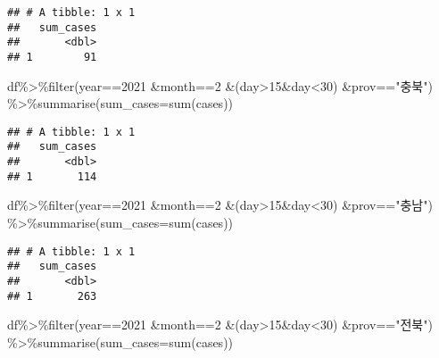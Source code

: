 \documentclass[
]{article}
\newenvironment{Shaded}{\begin{snugshade}}{\end{snugshade}}
\newcommand{\AttributeTok}[1]{\textcolor[rgb]{0.77,0.63,0.00}{#1}}
\newcommand{\DecValTok}[1]{\textcolor[rgb]{0.00,0.00,0.81}{#1}}
\newcommand{\FunctionTok}[1]{\textcolor[rgb]{0.00,0.00,0.00}{#1}}
\newcommand{\NormalTok}[1]{#1}
\newcommand{\SpecialCharTok}[1]{\textcolor[rgb]{0.00,0.00,0.00}{#1}}
\newcommand{\StringTok}[1]{\textcolor[rgb]{0.31,0.60,0.02}{#1}}
\begin{document}
\begin{verbatim}
## # A tibble: 1 x 1
##   sum_cases
##       <dbl>
## 1        91
\end{verbatim}

\begin{Shaded}
\begin{Highlighting}[]
\NormalTok{df}\SpecialCharTok{\%\textgreater{}\%}\FunctionTok{filter}\NormalTok{(year}\SpecialCharTok{==}\DecValTok{2021} \SpecialCharTok{\&}\NormalTok{month}\SpecialCharTok{==}\DecValTok{2} \SpecialCharTok{\&}\NormalTok{(day}\SpecialCharTok{\textgreater{}}\DecValTok{15}\SpecialCharTok{\&}\NormalTok{day}\SpecialCharTok{\textless{}}\DecValTok{30}\NormalTok{) }\SpecialCharTok{\&}\NormalTok{prov}\SpecialCharTok{==}\StringTok{"충북"}\NormalTok{) }\SpecialCharTok{\%\textgreater{}\%}\FunctionTok{summarise}\NormalTok{(}\AttributeTok{sum\_cases=}\FunctionTok{sum}\NormalTok{(cases))}
\end{Highlighting}
\end{Shaded}

\begin{verbatim}
## # A tibble: 1 x 1
##   sum_cases
##       <dbl>
## 1       114
\end{verbatim}

\begin{Shaded}
\begin{Highlighting}[]
\NormalTok{df}\SpecialCharTok{\%\textgreater{}\%}\FunctionTok{filter}\NormalTok{(year}\SpecialCharTok{==}\DecValTok{2021} \SpecialCharTok{\&}\NormalTok{month}\SpecialCharTok{==}\DecValTok{2} \SpecialCharTok{\&}\NormalTok{(day}\SpecialCharTok{\textgreater{}}\DecValTok{15}\SpecialCharTok{\&}\NormalTok{day}\SpecialCharTok{\textless{}}\DecValTok{30}\NormalTok{) }\SpecialCharTok{\&}\NormalTok{prov}\SpecialCharTok{==}\StringTok{"충남"}\NormalTok{) }\SpecialCharTok{\%\textgreater{}\%}\FunctionTok{summarise}\NormalTok{(}\AttributeTok{sum\_cases=}\FunctionTok{sum}\NormalTok{(cases))}
\end{Highlighting}
\end{Shaded}

\begin{verbatim}
## # A tibble: 1 x 1
##   sum_cases
##       <dbl>
## 1       263
\end{verbatim}

\begin{Shaded}
\begin{Highlighting}[]
\NormalTok{df}\SpecialCharTok{\%\textgreater{}\%}\FunctionTok{filter}\NormalTok{(year}\SpecialCharTok{==}\DecValTok{2021} \SpecialCharTok{\&}\NormalTok{month}\SpecialCharTok{==}\DecValTok{2} \SpecialCharTok{\&}\NormalTok{(day}\SpecialCharTok{\textgreater{}}\DecValTok{15}\SpecialCharTok{\&}\NormalTok{day}\SpecialCharTok{\textless{}}\DecValTok{30}\NormalTok{) }\SpecialCharTok{\&}\NormalTok{prov}\SpecialCharTok{==}\StringTok{"전북"}\NormalTok{) }\SpecialCharTok{\%\textgreater{}\%}\FunctionTok{summarise}\NormalTok{(}\AttributeTok{sum\_cases=}\FunctionTok{sum}\NormalTok{(cases))}
\end{Highlighting}
\end{Shaded}
\end{document}
